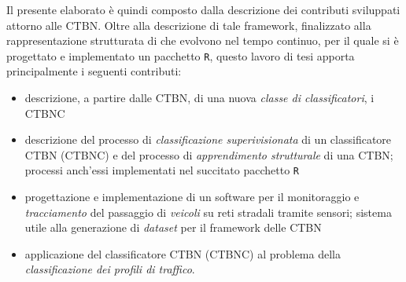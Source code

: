 Il presente elaborato è quindi composto dalla descrizione dei contributi sviluppati attorno alle \acl{CTBN}. Oltre alla descrizione di tale framework, finalizzato alla rappresentazione strutturata di \mprocess{} che evolvono nel tempo continuo, per il quale si è progettato e implementato un pacchetto \lstinline[]|R|, questo lavoro di tesi apporta principalmente i seguenti contributi:
\begin{itemize}
	\item descrizione, a partire dalle \acs{CTBN}, di una nuova \emph{classe di classificatori}, i \acf{CTBNC} \citep{Stella2012}
	\item descrizione del processo di \emph{classificazione superivisionata} di un classificatore \acl{CTBN} (\acs{CTBNC}) e del processo di \emph{apprendimento strutturale} di una \acs{CTBN}; processi anch'essi implementati nel succitato pacchetto \lstinline[]|R|
	\item progettazione e implementazione di un software per il monitoraggio e \emph{tracciamento} del passaggio di \emph{veicoli} su reti stradali tramite sensori; sistema utile alla generazione di \emph{dataset} per il framework delle \acs{CTBN}
	\item applicazione del classificatore \acs{CTBN} (\acs{CTBNC}) al problema della \emph{classificazione dei profili di traffico}.
\end{itemize}

